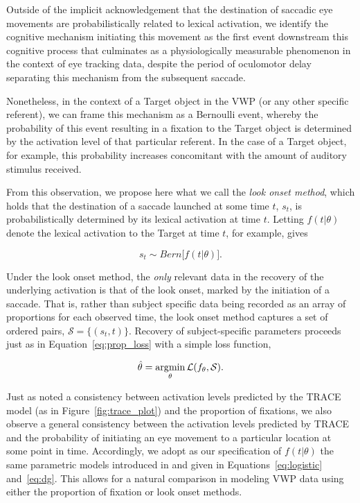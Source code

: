 Outside of the implicit acknowledgement that the destination of saccadic eye movements are probabilistically related to lexical activation, we identify the cognitive mechanism initiating this movement as the first event downstream this cognitive process that culminates as a physiologically measurable phenomenon in the context of eye tracking data, despite the period of oculomotor delay separating this mechanism from the subsequent saccade. 

Nonetheless, in the context of a Target object in the VWP (or any other specific referent), we can frame this mechanism as a Bernoulli event, whereby the probability of this event resulting in a fixation to the Target object is determined by the activation level of that particular referent. In the case of a Target object, for example, this probability increases concomitant with the amount of auditory stimulus received.

From this observation, we propose here what we call the \textit{look onset method}, which holds that the destination of a saccade launched at some time $t$, $s_t$, is probabilistically determined by its lexical activation at time $t$. Letting $f(t|\theta)$ denote the lexical activation to the Target at time $t$, for example, gives

\begin{equation}\label{eq:onset_distribution}
s_t \sim Bern \big[ f( t  |  \theta) \big].
\end{equation}

Under the look onset method, the \textit{only} relevant data in the recovery of the underlying activation is that of the look onset, marked by the initiation of a saccade. That is, rather than subject specific data being recorded as an array of proportions for each observed time, the look onset method captures a set of ordered pairs, $\mathcal{S} = \{(s_t, t)\}$. Recovery of subject-specific parameters proceeds just as in Equation~\ref{eq:prop_loss} with  a simple loss function,

\begin{equation}
\hat{\theta} = \operatorname*{arg\!\min}_{\theta} \mathcal{L}(f_{\theta}, \mathcal{S}).
\end{equation}


Just as \citet{allopenna1998tracking} noted a consistency between activation levels predicted by the TRACE model (as in Figure~\ref{fig:trace_plot}) and the proportion of fixations, we also observe a general consistency between the activation levels predicted by TRACE and the probability of initiating an eye movement to a particular location at some point in time. Accordingly, we adopt as our specification of $f(t|\theta)$ the same parametric models introduced in \citet{mcmurray2010individual} and given in Equations~\ref{eq:logistic} and~\ref{eq:dg}. This allows for a natural comparison in modeling VWP data using either the proportion of fixation or look onset methods.

